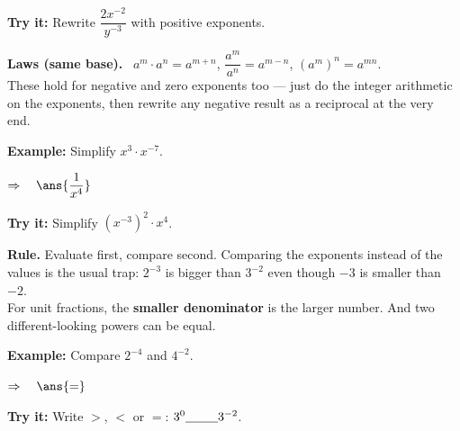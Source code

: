 \documentclass[12pt]{article}
\begin{document}
\begin{tryitbox}
\textbf{Try it:} \quad Rewrite $\dfrac{2x^{-2}}{y^{-3}}$ with positive
exponents.\\[2pt]
\end{tryitbox}


\begin{formulabox}
\textbf{Laws (same base).} \ $a^{m} \cdot a^{n} = a^{m+n}$, \quad
$\dfrac{a^{m}}{a^{n}} = a^{m-n}$, \quad $\left(a^{m}\right)^{n} = a^{mn}$.\\[3pt]
These hold for negative and zero exponents too --- just do the integer
arithmetic on the exponents, then rewrite any negative result as a
reciprocal at the very end.
\end{formulabox}

\begin{examplebox}
\textbf{Example:} \quad Simplify $x^{3} \cdot x^{-7}$.

$\Rightarrow\quad \ans{\dfrac{1}{x^{4}}}$
\end{examplebox}

\begin{tryitbox}
\textbf{Try it:} \quad Simplify $\left(x^{-3}\right)^{2} \cdot x^{4}$.\\[2pt]
\end{tryitbox}


\begin{formulabox}
\textbf{Rule.} Evaluate first, compare second. Comparing the exponents
instead of the values is the usual trap: $2^{-3}$ is bigger than $3^{-2}$
even though $-3$ is smaller than $-2$.\\[3pt]
For unit fractions, the \textbf{smaller denominator} is the larger number.
And two different-looking powers can be equal.
\end{formulabox}

\begin{examplebox}
\textbf{Example:} \quad Compare $2^{-4}$ and $4^{-2}$.

$\Rightarrow\quad \ans{=}$
\end{examplebox}

\begin{tryitbox}
\textbf{Try it:} \quad Write $>$, $<$ or $=$: \quad
$3^{0} \underline{\hspace{0.9cm}} 3^{-2}$.\\[2pt]
\end{tryitbox}
\end{document}
